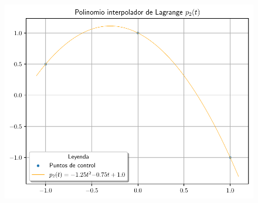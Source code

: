 \begin{frame}
	\begin{solution}
		\begin{figure}[ht!]
			\centering
			\includegraphics[width=.72\paperwidth]{p6}
		\end{figure}
	\end{solution}
\end{frame}